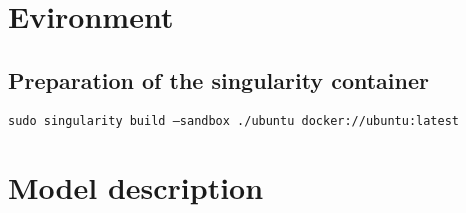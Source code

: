 \cleardoublepage

\section{Evironment}
\label{sec:env}

\subsection{Preparation of the singularity container}
\label{subsec:prepCont}
\texttt{sudo singularity build --sandbox ./ubuntu docker://ubuntu:latest}\\


\section{Model description}
\label{sec:modDesc}

